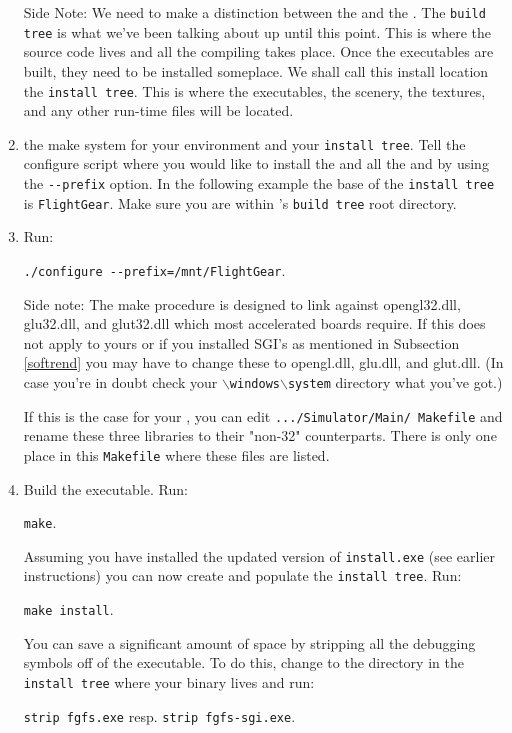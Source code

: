 \begin{enumerate}
Side Note: We need to make a distinction between the
\texttt{} and the \texttt{}.
The \texttt{build tree} is what we've been talking about up until
this point.  This is where the source code lives and all the
compiling takes place.  Once the executables are built, they need
to be installed someplace.  We shall call this install location
the \texttt{install tree}.  This is where the executables, the
scenery, the textures, and any other run-time files will be
located.

\item {} the make system for your environment and your
\texttt{install tree}. Tell the configure script where you would like to install the
 and all the  and  by using the
\texttt{-$\!$-prefix} option. In the following example the base of the \texttt{install
tree} is \texttt{FlightGear}. Make sure you are within \FlightGear's \texttt{build tree}
root directory.

\item Run:

        \texttt{./configure -$\!$-prefix=/mnt/FlightGear}.

 \noindent
Side note: The make procedure is designed to link against opengl32.dll, glu32.dll, and
glut32.dll which most accelerated boards require. If this does not apply to yours or if
you installed SGI's  as mentioned in Subsection \ref{softrend}
you may have to change these to opengl.dll, glu.dll, and glut.dll. (In case you're in
doubt check your \texttt{$\backslash$windows$\backslash$system} directory what you've
got.)

 If this is the case for your , you can edit
 \texttt{.../Simulator/Main/ Makefile} and rename these three libraries to
    their "non-32" counterparts.  There is only one place in this
    \texttt{Makefile} where these files are listed.

\item Build the executable.  Run:

        \texttt{make}.

Assuming you have installed the updated version of \texttt{install.exe} (see earlier
instructions) you can now create and populate the \texttt{install tree}.  Run:

        \texttt{make install}.

    You can save a significant amount of space by stripping all the
    debugging symbols off of the executable.  To do this, change to the
    directory in the \texttt{install tree} where your binary lives and run:

    \texttt{strip fgfs.exe} resp. \texttt{strip fgfs-sgi.exe}.
  \end{enumerate}

